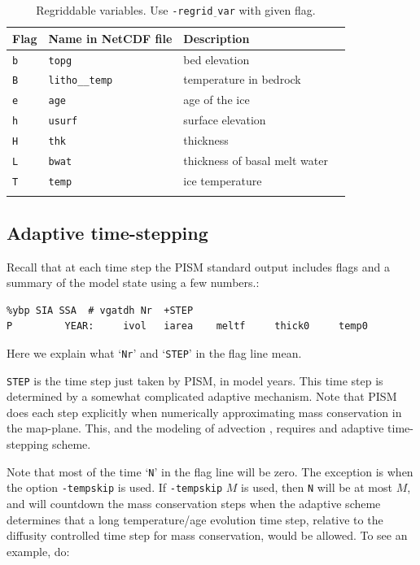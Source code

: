 \documentclass[11pt,final]{amsart}
\newcommand{\und}{\_\!\_}
\begin{document}
\begin{table}[ht]
\caption{Regriddable variables.\index{regrid\und vars}  Use \texttt{-regrid$\underline{\phantom{b}}$var} with given flag.}\label{tab:regridvar}
\begin{tabular}{@{}llll}\hline
\textbf{Flag} & \textbf{Name in NetCDF file} & \textbf{Description}\\ \hline
\verb|b| & \texttt{topg}       & bed elevation \\
\verb|B| & \texttt{litho\und temp} & temperature in bedrock \\
\verb|e| & \texttt{age}        & age of the ice \\
\verb|h| & \texttt{usurf}      & surface elevation \\
\verb|H| & \texttt{thk}        & thickness \\
\verb|L| & \texttt{bwat}       & thickness of basal melt water \\
\verb|T| & \texttt{temp}       & ice temperature \\
\hline
\normalsize
\end{tabular}
\end{table}


\subsection{Adaptive time-stepping} \label{subsect:adapt} Recall that at each time step the PISM standard output includes flags and a summary of the model state using a few numbers.:
\begin{verbatim}
%ybp SIA SSA  # vgatdh Nr  +STEP
P         YEAR:     ivol   iarea    meltf     thick0     temp0
\end{verbatim}
Here we explain what `\verb|Nr|' and `\verb|STEP|' in the flag line mean.

\verb|STEP| is the time step just taken by PISM, in model years.  This time step is determined by a somewhat complicated adaptive mechanism.  Note that PISM does each step explicitly when numerically approximating mass conservation in the map-plane.  This, and the modeling of advection \cite{BBL}, requires and adaptive time-stepping scheme.

Note that most of the time `\verb|N|' in the flag line will be zero.  The exception is when the option \verb|-tempskip| is used.  If \verb|-tempskip| $M$ is used, then \verb|N| will be at most $M$, and will countdown the mass conservation steps when the adaptive scheme determines that a long temperature/age evolution time step, relative to the diffusity controlled time step for mass conservation, would be allowed.  To see an example, do:
\end{document}
